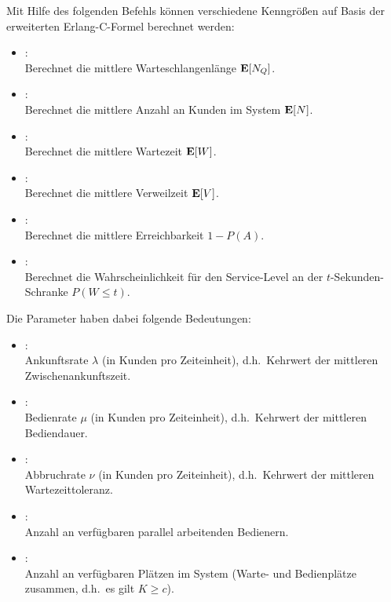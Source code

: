 Mit Hilfe des folgenden Befehls können verschiedene Kenngrößen auf Basis der
erweiterten Erlang-C-Formel berechnet werden:

\begin{itemize}

\item
{}:\\
Berechnet die mittlere Warteschlangenlänge ${\bf E}[N_Q]$. 

\item
{}:\\
Berechnet die mittlere Anzahl an Kunden im System ${\bf E}[N]$.

\item
{}:\\
Berechnet die mittlere Wartezeit ${\bf E}[W]$.

\item
{}:\\
Berechnet die mittlere Verweilzeit ${\bf E}[V]$.

\item
{}:\\
Berechnet die mittlere Erreichbarkeit $1-P(A)$.

\item
{}:\\
Berechnet die Wahrscheinlichkeit für den Service-Level an der $t$-Sekunden-Schranke $P(W\le t)$.

\end{itemize}

Die Parameter haben dabei folgende Bedeutungen:
\begin{itemize}
\item
{}:\\
Ankunftsrate $\lambda$ (in Kunden pro Zeiteinheit), d.h.\ Kehrwert der mittleren Zwischenankunftszeit.
\item
{}:\\
Bedienrate $\mu$ (in Kunden pro Zeiteinheit), d.h.\ Kehrwert der mittleren Bediendauer.
\item
{}:\\
Abbruchrate $\nu$ (in Kunden pro Zeiteinheit), d.h.\ Kehrwert der mittleren Wartezeittoleranz.
\item
{}:\\
Anzahl an verfügbaren parallel arbeitenden Bedienern.
\item
{}:\\
Anzahl an verfügbaren Plätzen im System (Warte- und Bedienplätze zusammen, d.h.\ es gilt $K\ge c$).
\end{itemize}



